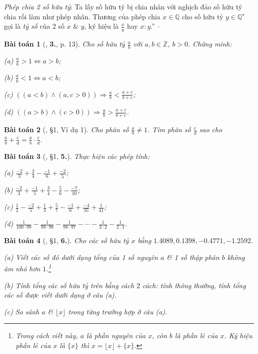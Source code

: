 \documentclass{article}
\numberwithin{equation}{section}
\newtheorem{baitoan}{Bài toán}[section]
\begin{document}
\noindent\textit{Phép chia 2 số hữu tỷ}: Ta lấy số hữu tỷ bị chia nhân với nghịch đảo số hữu tỷ chia rồi làm như phép nhân. Thương của phép chia $x\in\mathbb{Q}$ cho số hữu tỷ $y\in\mathbb{Q}^\star$ gọi là \textit{tỷ số} của 2 số $x$ \& $y$, ký hiệu là $\frac{x}{y}$ hay $x:y$.'' -- \cite[\S3, p. 10]{Trong_Toan_7_2022}

\begin{baitoan}[\cite{Trong_Toan_7_2022}, \textbf{3.}, p. 13]
	Cho số hữu tỷ $\frac{a}{b}$ với $a,b\in\mathbb{Z}$, $b > 0$. Chứng minh:
	\begin{enumerate*}
		\item[(a)] $\frac{a}{b} > 1\Leftrightarrow a > b$;
		\item[(b)] $\frac{a}{b} < 1\Leftrightarrow a < b$;
		\item[(c)] $((a < b)\land(a,c > 0))\Rightarrow\frac{a}{b} < \frac{a + c}{b + c}$;
		\item[(d)] $((a > b)\land(c > 0))\Rightarrow\frac{a}{b} > \frac{a + c}{b + c}$.
	\end{enumerate*}
\end{baitoan}

\begin{baitoan}[\cite{Binh_Toan_7_tap_1}, \S1, Ví dụ 1]
	Cho phân số $\frac{a}{b}\ne 1$. Tìm phân số $\frac{c}{d}$ sao cho $\frac{a}{b} + \frac{c}{d} = \frac{a}{b}\cdot\frac{c}{d}$.
\end{baitoan}

\begin{baitoan}[\cite{Binh_Toan_7_tap_1}, \S1, \textbf{5.}]
	Thực hiện các phép tính:
	\begin{enumerate*}
		\item[(a)] $\frac{-2}{3} + \frac{3}{4} - \frac{-1}{6} + \frac{-2}{5}$;
		\item[(b)] $\frac{-2}{3} + \frac{-1}{5} + \frac{3}{4} - \frac{5}{6} - \frac{-7}{10}$;
		\item[(c)] $\frac{1}{2} - \frac{-2}{5} + \frac{1}{3} + \frac{5}{7} - \frac{-1}{6} + \frac{-4}{35} + \frac{1}{41}$;
		\item[(d)] $\frac{1}{100\cdot 99} - \frac{1}{99\cdot 98} - \frac{1}{98\cdot 97} - \cdots - \frac{1}{3\cdot 2} - \frac{1}{2\cdot 1}$.
	\end{enumerate*}
\end{baitoan}

\begin{baitoan}[\cite{Binh_Toan_7_tap_1}, \S1, \textbf{6.}]
	Cho các số hữu tỷ $x$ bằng $1.4089,0.1398,-0.4771,-1.2592$.
	\begin{enumerate*}
		\item[(a)] Viết các số đó dưới dạng tổng của 1 số nguyên $a$ \& 1 số thập phân $b$ không âm nhỏ hơn $1$.\footnote{Trong cách viết này, $a$ là phần nguyên của $x$, còn $b$ là phần lẻ của $x$. Ký hiệu phần lẻ của $x$ là $\{x\}$ thì $x = \lfloor x\rfloor + \{x\}$.}
		\item[(b)] Tính tổng các số hữu tỷ trên bằng cách $2$ cách: tính thông thường, tính tổng các số được viết dưới dạng ở câu (a).
		\item[(c)] So sánh $a$ \& $\lfloor x\rfloor$ trong từng trường hợp ở câu (a).
	\end{enumerate*}
\end{baitoan}
\end{document}
